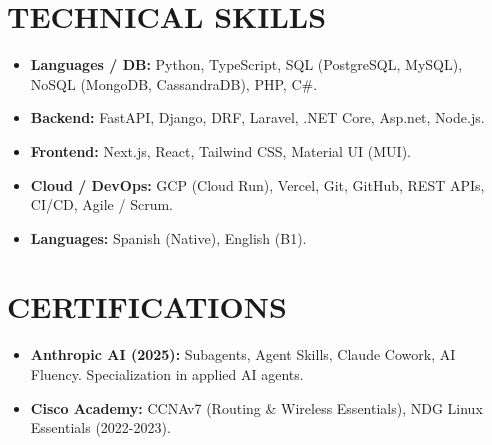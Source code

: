\documentclass[letterpaper,11pt]{article}
\begin{document}
  \vspace{-6pt}

  \section{TECHNICAL SKILLS}
  \small
  \begin{itemize}[leftmargin=0.15in, label={}]
    \item \textbf{Languages / DB:} Python, TypeScript, SQL (PostgreSQL, MySQL), NoSQL (MongoDB, CassandraDB), PHP, C\#.
    \item \textbf{Backend:} FastAPI, Django, DRF, Laravel, .NET Core, Asp.net, Node.js.
    \item \textbf{Frontend:} Next.js, React, Tailwind CSS, Material UI (MUI).
    \item \textbf{Cloud / DevOps:} GCP (Cloud Run), Vercel, Git, GitHub, REST APIs, CI/CD, Agile / Scrum.
    \item \textbf{Languages:} Spanish (Native), English (B1).
  \end{itemize}

  \vspace{-12pt}

  \section{CERTIFICATIONS}
    \begin{itemize}[leftmargin=0.15in, label={}]
      \item \small \textbf{Anthropic AI (2025):} Subagents, Agent Skills, Claude Cowork, AI Fluency. Specialization in applied AI agents.
      \item \small \textbf{Cisco Academy:} CCNAv7 (Routing \& Wireless Essentials), NDG Linux Essentials (2022-2023).
    \end{itemize}

  
\end{document}
